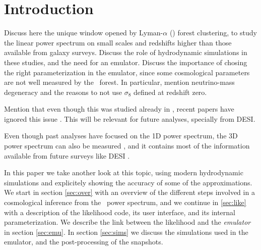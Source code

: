 \section{Introduction} 

Discuss here the unique window opened by Lyman-$\alpha$ (\lya) forest 
clustering, to study the linear power spectrum on small scales and redshifts 
higher than those available from galaxy surveys.
Discuss the role of hydrodynamic simulations in these studies, and the need 
for an emulator.
Discuss the importance of chosing the right parameterization in the emulator, 
since some cosmological parameters are not well measured by the \lya\ forest.
In particular, mention neutrino-mass degeneracy and the reasons to not use 
$\sigma_8$ defined at redshift zero.

Mention that even though this was studied already in \cite{McDonald2005a}, 
recent papers have ignored this issue \cite{Palanque-Delabrouille2015,
Yeche2017}. 
This will be relevant for future analyses, specially from DESI.

Even though past analyses have focused on the 1D power spectrum, 
the 3D power spectrum can also be measured \cite{Font-Ribera2018}, 
and it contains most of the information available from future surveys 
like DESI \cite{Font-Ribera2014}. 

In this paper we take another look at this topic, using modern hydrodynamic 
simulations and explicitely showing the accuracy of some of the approximations.
We start in section \ref{sec:over} with an overview of the different steps 
involved in a cosmological inference from the \lya\ power spectrum, and we 
continue in \ref{sec:like} with a description of the likelihood code, 
its user interface, and its internal parameterization. 
We describe the link between the likelihood and the \textit{emulator} in
section \ref{sec:emu}.
In section \ref{sec:sims} we discuss the simulations used in the emulator, 
and the post-processing of the snapshots. 
 
